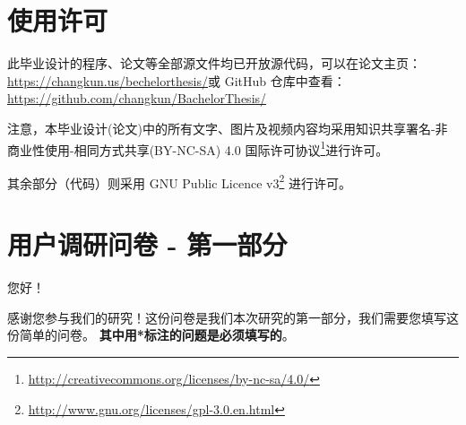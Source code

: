 
\appendix

  \chapter{\heiti 使用许可}
  \label{appendix:a}

  此毕业设计的程序、论文等全部源文件均已开放源代码，可以在论文主页：\url{https://changkun.us/bechelorthesis/}或 GitHub 仓库中查看：\url{https://github.com/changkun/BachelorThesis/}

  注意，本毕业设计(论文)中的所有文字、图片及视频内容均采用知识共享署名-非商业性使用-相同方式共享(BY-NC-SA) 4.0 国际许可协议\footnote{\url{http://creativecommons.org/licenses/by-nc-sa/4.0/}}进行许可。

  其余部分（代码）则采用 GNU Public Licence v3\footnote{\url{http://www.gnu.org/licenses/gpl-3.0.en.html}} 进行许可。

  \cleardoublepage

  \chapter{\heiti 用户调研问卷 - 第一部分}
  \label{appendix:b}

  您好！

  感谢您参与我们的研究！这份问卷是我们本次研究的第一部分，我们需要您填写这份简单的问卷。
  \textbf{其中用*标注的问题是必须填写的}。

